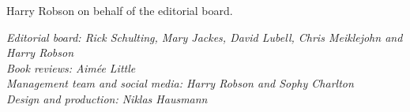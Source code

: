 \documentclass[12pt,a4paper]{article}
\begin{document}
 \vspace{5mm}

 \noindent Harry Robson on behalf of the editorial board.

 \vspace{50mm}

 \raggedleft\itshape
 Editorial board: Rick Schulting, Mary Jackes, David Lubell, Chris Meiklejohn and Harry Robson\\
 Book reviews: Aimée Little\\
 Management team and social media: Harry Robson and Sophy Charlton\\
 Design and production: Niklas Hausmann
\end{document}
